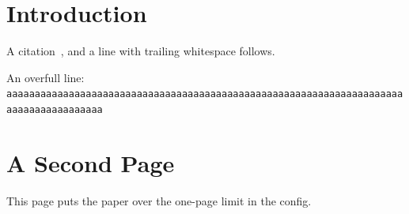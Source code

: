 \section{Introduction}

A citation~\cite{cited}, and a line with trailing whitespace follows.   

An overfull line:
\texttt{aaaaaaaaaaaaaaaaaaaaaaaaaaaaaaaaaaaaaaaaaaaaaaaaaaaaaaaaaaaaaaaaaaaaaaaaaaaaaaaaaaaaaaa}

\clearpage
\section{A Second Page}

This page puts the paper over the one-page limit in the config.

